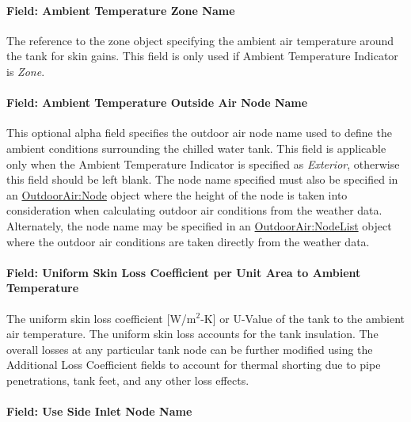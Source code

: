 \paragraph{Field: Ambient Temperature Zone
Name}\label{field-ambient-temperature-zone-name-thermalstoragehotwaterstratified}

The reference to the zone object specifying the ambient air temperature around
the tank for skin gains. This field is only used if Ambient Temperature
Indicator is \emph{Zone}.

\paragraph{Field: Ambient Temperature Outside Air Node
Name}\label{field-ambient-temperature-outside-air-node-name-thermalstoragehotwaterstratified}

This optional alpha field specifies the outdoor air node name used to define the
ambient conditions surrounding the chilled water tank. This field is applicable
only when the Ambient Temperature Indicator is specified as \emph{Exterior},
otherwise this field should be left blank. The node name specified must also be
specified in an \hyperref[outdoorairnode]{OutdoorAir:Node} object where the
height of the node is taken into consideration when calculating outdoor air
conditions from the weather data. Alternately, the node name may be specified in
an \hyperref[outdoorairnodelist]{OutdoorAir:NodeList} object where the outdoor
air conditions are taken directly from the weather data.

\paragraph{Field: Uniform Skin Loss Coefficient per Unit Area to Ambient
Temperature}\label{field-uniform-skin-loss-coefficient-per-unit-area-to-ambient-temperature-thermalstoragehotwaterstratified}

The uniform skin loss coefficient {[}W/m\(^{2}\)-K{]} or U-Value of the tank to
the ambient air temperature. The uniform skin loss accounts for the tank
insulation. The overall losses at any particular tank node can be further
modified using the Additional Loss Coefficient fields to account for thermal
shorting due to pipe penetrations, tank feet, and any other loss effects.

\paragraph{Field: Use Side Inlet Node
Name}\label{field-use-side-inlet-node-name-thermalstoragehotwaterstratified}

